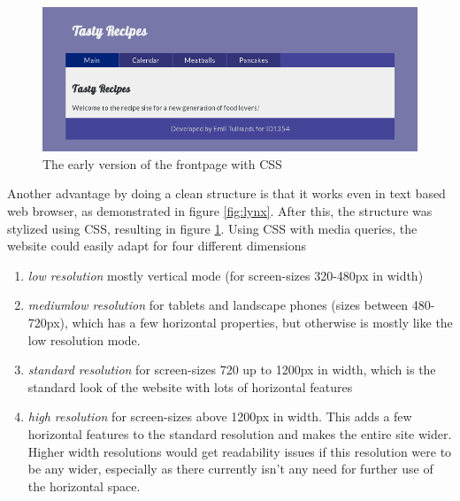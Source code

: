 \documentclass[a4paper]{scrartcl}
\begin{document}
\begin{figure}[!h]
  \begin{center}
    \includegraphics[scale=0.4]{frontpage1.png}
    \caption{The early version of the frontpage with CSS}
    \label{fig:early frontpage}
  \end{center}
\end{figure}

Another advantage by doing a clean structure is that it works even in text based web browser, as demonstrated in figure \ref{fig:lynx}. After this, the structure was stylized using CSS, resulting in figure \ref{fig:early frontpage}. Using CSS with media queries, the website could easily adapt for four different dimensions 

\begin{enumerate}
\item \textit{low resolution} mostly vertical mode (for screen-sizes 320-480px in width)
\item \textit{mediumlow resolution} for tablets and landscape phones (sizes between 480-720px), which has a few horizontal properties, but otherwise is mostly like the low resolution mode.
\item \textit{standard resolution} for screen-sizes 720 up to 1200px in width, which is the standard look of the website with lots of horizontal features
\item \textit{high resolution} for screen-sizes above 1200px in width. This adds a few horizontal features to the standard resolution and makes the entire site wider. Higher width resolutions would get readability issues if this resolution were to be any wider, especially as there currently isn't any need for further use of the horizontal space.
\end{enumerate}
\end{document}
